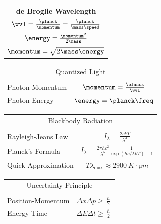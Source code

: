 \begin{tabular}{| c |}
    \hline
    \multicolumn{1}{|c|}{de Broglie Wavelength} \\
    \hline
    $\wvl=\frac{\planck}{\momentum}=\frac{\planck}{\mass \speed}$ \\
    $\energy=\frac{\momentum^2}{2\mass}$ \\
    $\momentum=\sqrt{2\mass\energy}$ \\
    \hline
\end{tabular}

\begin{tabular}{| l  c|}
    \hline
    \multicolumn{2}{|c|}{Quantized Light} \\
    \vspace{-0.9cm}\\
    \hline
    Photon Momentum &$\momentum=\frac{\planck}{\wvl}$ \\
    Photon Energy & $\energy=\planck\freq$ \\
    \hline
\end{tabular}

\begin{tabular}{| l  c|}
    \hline
    \multicolumn{2}{|c|}{Blackbody Radiation} \\
    \vspace{-0.9cm}\\
    \hline
    Rayleigh-Jeans Law & $I_{\lambda}=\frac{2ckT}{\lambda^4}$ \\
    Planck's Formula & $I_{\lambda}=\frac{2\pi h c^2}{\lambda^5}\frac{1}{\exp(hc/\lambda k T)-1}$ \\
    Quick Approximation & $T\lambda_{\text{max}}\approx 2900\ \unit{K\cdot\micro m}$ \\
    \hline
\end{tabular}

\begin{tabular}{| l  c|}
    \hline
    \multicolumn{2}{|c|}{Uncertainty Principle} \\
    \vspace{-0.9cm}\\
    \hline
    Position-Momentum & $\Delta x \Delta p \geq \frac{\hslash}{2}$ \\
    Energy-Time & $\Delta E \Delta t \geq \frac{\hslash}{2}$ \\
    \hline
\end{tabular}